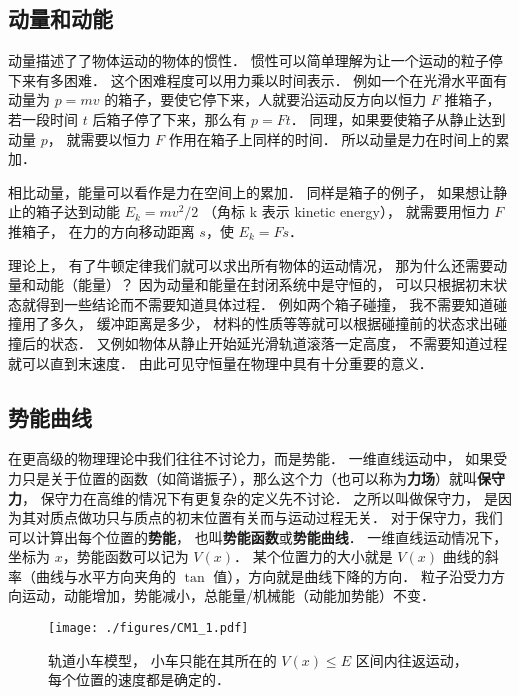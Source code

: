 

\subsection{动量和动能}
动量描述了了物体运动的物体的惯性． 惯性可以简单理解为让一个运动的粒子停下来有多困难． 这个困难程度可以用力乘以时间表示． 例如一个在光滑水平面有动量为 $p = mv$ 的箱子，要使它停下来，人就要沿运动反方向以恒力 $F$ 推箱子， 若一段时间 $t$ 后箱子停了下来，那么有 $p = Ft$．%
同理，如果要使箱子从静止达到动量 $p$， 就需要以恒力 $F$ 作用在箱子上同样的时间． 所以动量是力在时间上的累加．

相比动量，能量可以看作是力在空间上的累加． 同样是箱子的例子， 如果想让静止的箱子达到动能 $E_k = mv^2/2$ （角标 k 表示 kinetic energy）， 就需要用恒力 $F$ 推箱子， 在力的方向移动距离 $s$，使 $E_k = Fs$．

理论上， 有了牛顿定律我们就可以求出所有物体的运动情况， 那为什么还需要动量和动能（能量）？ 因为动量和能量在封闭系统中是守恒的， 可以只根据初末状态就得到一些结论而不需要知道具体过程． 例如两个箱子碰撞， 我不需要知道碰撞用了多久， 缓冲距离是多少， 材料的性质等等就可以根据碰撞前的状态求出碰撞后的状态． 又例如物体从静止开始延光滑轨道滚落一定高度， 不需要知道过程就可以直到末速度． 由此可见守恒量在物理中具有十分重要的意义．

\subsection{势能曲线}
在更高级的物理理论中我们往往不讨论力，而是势能． 一维直线运动中， 如果受力只是关于位置的函数（如简谐振子），那么这个力（也可以称为\textbf{力场}）就叫\textbf{保守力}， 保守力在高维的情况下有更复杂的定义先不讨论． 之所以叫做保守力， 是因为其对质点做功只与质点的初末位置有关而与运动过程无关． 对于保守力，我们可以计算出每个位置的\textbf{势能}， 也叫\textbf{势能函数}或\textbf{势能曲线}． 一维直线运动情况下，坐标为 $x$，势能函数可以记为 $V(x)$． 某个位置力的大小就是 $V(x)$ 曲线的斜率（曲线与水平方向夹角的 $\tan$ 值），方向就是曲线下降的方向． 粒子沿受力方向运动，动能增加，势能减小，总能量/机械能（动能加势能）不变．

\begin{figure}[ht]
\centering
\texttt{[image: ./figures/CM1\_1.pdf]}
\caption{轨道小车模型， 小车只能在其所在的 $V(x) \leqslant E$ 区间内往返运动， 每个位置的速度都是确定的．} \label{CM1_fig1}
\end{figure}


